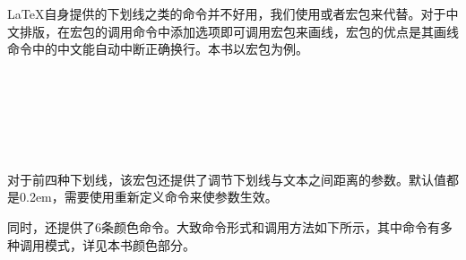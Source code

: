 \LaTeX 自身提供的下划线之类的命令并不好用，我们使用或者宏包来代替。对于中文排版，在宏包的调用命令中添加选项即可调用宏包来画线，宏包的优点是其画线命令中的中文能自动中断正确换行。本书以宏包为例。

\begin{codeshow}
\\
\\
\\
\\
\\
\end{codeshow}

对于前四种下划线，该宏包还提供了调节下划线与文本之间距离的参数。默认值都是0.2em，需要使用重新定义命令来使参数生效。

\begin{latex}{}
\CJKunderdotbasesep
\CJKunderlinebasesep
\CJKunderdbllinebasesep
\CJKunderwavebasesep
\renewcommand{\CJKunderlinebasesep}{0.5em}
\end{latex}

同时，还提供了6条颜色命令。大致命令形式和调用方法如下所示，其中命令有多种调用模式，详见本书颜色部分。

\begin{latex}{}
\CJKunderlinecolor
\renewcommand{\CJKunderline}{\color{blue}}
\end{latex}

